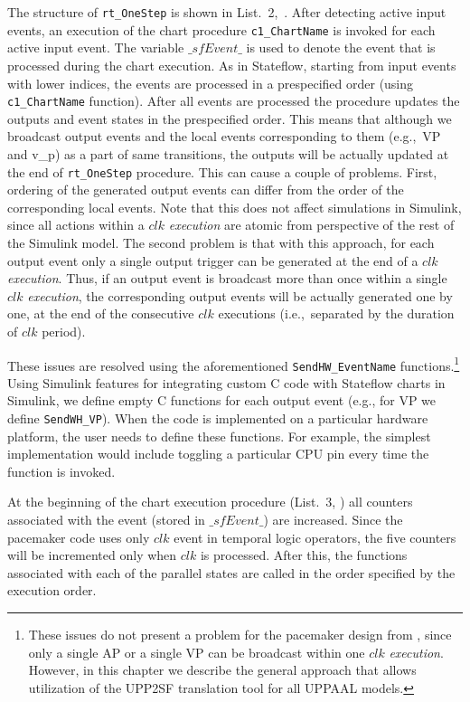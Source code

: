 The structure of \texttt{rt\_OneStep} is shown in List.~2,~. After detecting active input events, an execution of the chart procedure \texttt{c1\_ChartName} is invoked for each active input event. The variable $\_sfEvent\_$ is used to denote the event that is processed during the chart execution. As in Stateflow, starting from input events with lower indices, the events are processed in a prespecified order (using \texttt{c1\_ChartName} function). After all events are processed the procedure updates the outputs and event states in the prespecified order. This means that although we broadcast output events and the local events corresponding to them (e.g.,~VP and v\_p) as a part of same transitions, the outputs will be actually updated at the end of \texttt{rt\_OneStep} procedure. This can cause a couple of problems. First, ordering of the generated output events can differ from the order of the corresponding local events. Note that this does not affect simulations in Simulink, since all actions within a $clk$ \textit{execution} are atomic from perspective of the rest of the Simulink model. The second problem is that with this approach, for each output event only a single output trigger can be generated at the end of a $clk$ \textit{execution}. Thus, if an output event is broadcast more than once within a single $clk$ \textit{execution}, the corresponding output events will be actually generated one by one, at the end of the consecutive $clk$ executions (i.e.,~separated by the duration of $clk$ period).

These issues are resolved using the aforementioned \texttt{SendHW\_EventName} functions.\footnote{These issues do not present a problem for the pacemaker design from , since only a single AP or a single VP can be broadcast within one $clk$ \textit{execution}. However, in this chapter we describe the general approach that allows utilization of the UPP2SF translation tool for all UPPAAL models.} Using Simulink features for integrating custom C code with Stateflow charts in Simulink, we define empty C functions for each output event (e.g., for VP we define \texttt{SendWH\_VP}). When the code is implemented on a particular hardware platform, the user needs to define these functions. For example, the simplest implementation would include toggling a particular CPU pin every time the function is invoked. 

At the beginning of the chart execution procedure (List.~3, ) all counters associated with the event (stored in $\_sfEvent\_$) are increased. Since the pacemaker code uses only $clk$ event in temporal logic operators, the five counters will be incremented only when $clk$ is processed. After this, the functions associated with each of the parallel states are called in the order specified by the execution order. 


